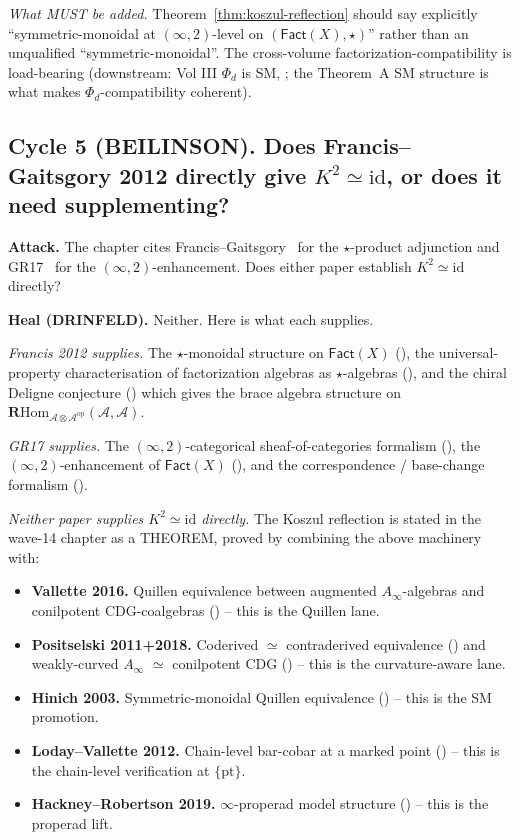 \documentclass[11pt]{article}
\theoremstyle{definition}
\newcommand{\Fact}{\mathsf{Fact}}
\newcommand{\id}{\mathrm{id}}
\newcommand{\cA}{\mathcal{A}}
\newcommand{\RHom}{\mathbf{R}\mathrm{Hom}}
\begin{document}
\emph{What MUST be added.} Theorem~\ref{thm:koszul-reflection} should
say explicitly ``symmetric-monoidal at $(\infty,2)$-level on
$(\Fact(X),\star)$'' rather than an unqualified ``symmetric-monoidal''.
The cross-volume factorization-compatibility is load-bearing
(downstream: Vol III $\Phi_d$ is SM, \cite{cy_to_chiral.tex}; the
Theorem~A SM structure is what makes $\Phi_d$-compatibility
coherent).

\subsection*{Cycle 5 (BEILINSON). Does Francis--Gaitsgory 2012 directly
give $K^{2}\simeq\id$, or does it need supplementing?}

\textbf{Attack.} The chapter cites Francis--Gaitsgory~\cite{Francis2012}
for the $\star$-product adjunction and GR17~\cite{GR17} for the
$(\infty,2)$-enhancement. Does either paper establish
$K^{2}\simeq\id$ directly?

\textbf{Heal (DRINFELD).} Neither. Here is what each supplies.

\emph{Francis 2012 supplies.} The $\star$-monoidal structure on
$\Fact(X)$ (\cite[\S4.2]{Francis2012}), the universal-property
characterisation of factorization algebras as $\star$-algebras
(\cite[\S3]{Francis2012}), and the chiral Deligne conjecture
(\cite[\S5]{Francis2012}) which gives the brace algebra
structure on $\RHom_{\cA\otimes\cA^{\mathrm{op}}}(\cA,\cA)$.

\emph{GR17 supplies.} The $(\infty,2)$-categorical sheaf-of-categories
formalism (\cite[Part IV]{GR17}), the $(\infty,2)$-enhancement of
$\Fact(X)$ (\cite[Chapter IV.5, Theorem 3.1.2]{GR17}), and the
correspondence / base-change formalism (\cite[Chapter IV.1]{GR17}).

\emph{Neither paper supplies $K^{2}\simeq\id$ directly.} The Koszul
reflection is stated in the wave-14 chapter as a THEOREM, proved by
combining the above machinery with:
\begin{itemize}
\item \textbf{Vallette 2016.} Quillen equivalence between
augmented $A_\infty$-algebras and conilpotent CDG-coalgebras
(\cite[Theorem 2.1]{Val16}) -- this is the Quillen lane.
\item \textbf{Positselski 2011+2018.} Coderived $\simeq$
contraderived equivalence (\cite{Positselski2011}) and
weakly-curved $A_\infty$ $\simeq$ conilpotent CDG
(\cite[Theorem 9.1]{Positselski2018}) -- this is the
curvature-aware lane.
\item \textbf{Hinich 2003.} Symmetric-monoidal Quillen equivalence
(\cite[\S6]{Hinich2003}) -- this is the SM promotion.
\item \textbf{Loday--Vallette 2012.} Chain-level bar-cobar at a
marked point (\cite[Theorem 11.4.1]{LV12}) -- this is the
chain-level verification at $\{\mathrm{pt}\}$.
\item \textbf{Hackney--Robertson 2019.} $\infty$-properad model
structure (\cite[Theorem 5.12]{HackneyRobertson2019}) -- this
is the properad lift.
\end{itemize}
\end{document}
